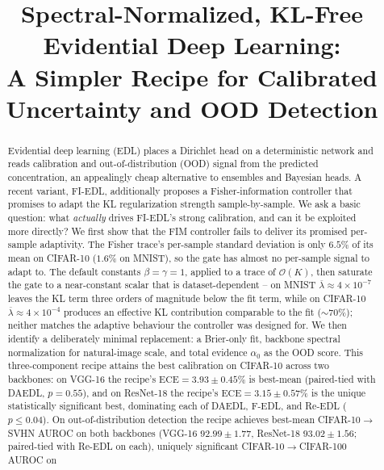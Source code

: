 \documentclass[review,5p,times]{elsarticle}
\newcommand{\todo}[1]{\textcolor{red}{\textbf{[TODO: #1]}}}
\begin{document}
\begin{frontmatter}

\title{Spectral-Normalized, KL-Free Evidential Deep Learning:\\
A Simpler Recipe for Calibrated Uncertainty and OOD Detection}


\begin{abstract}
Evidential deep learning (EDL) places a Dirichlet head on a deterministic
network and reads calibration and out-of-distribution (OOD) signal from the
predicted concentration, an appealingly cheap alternative to ensembles and
Bayesian heads. A recent variant, FI-EDL, additionally proposes a
Fisher-information controller that promises to adapt the KL regularization
strength sample-by-sample. We ask a basic question: what \emph{actually}
drives FI-EDL's strong calibration, and can it be exploited more directly?
We first show that the FIM controller fails to deliver its promised
per-sample adaptivity. The Fisher trace's per-sample standard deviation
is only $6.5\%$ of its mean on CIFAR-10 ($1.6\%$ on MNIST), so the gate
has almost no per-sample signal to adapt to. The default constants
$\beta\!=\!\gamma\!=\!1$, applied to a trace of $\mathcal{O}(K)$, then
saturate the gate to a near-constant scalar that is dataset-dependent --
on MNIST $\overline{\lambda}\!\approx\!4\!\times\!10^{-7}$ leaves the KL
term three orders of magnitude below the fit term, while on CIFAR-10
$\overline{\lambda}\!\approx\!4\!\times\!10^{-4}$ produces an effective
KL contribution comparable to the fit ($\sim\!70\%$); neither matches the
adaptive behaviour the controller was designed for. We then identify a deliberately minimal
replacement: a Brier-only fit, backbone spectral normalization for
natural-image scale, and total evidence $\alpha_0$ as the OOD score. This
three-component recipe attains the best calibration on CIFAR-10 across
two backbones: on VGG-16 the recipe's $\text{ECE}\!=\!3.93\!\pm\!0.45\%$
is best-mean (paired-tied with DAEDL, $p\!=\!0.55$), and on ResNet-18
the recipe's $\text{ECE}\!=\!3.15\!\pm\!0.57\%$ is the unique
statistically significant best, dominating each of DAEDL, F-EDL, and
Re-EDL ($p\!\le\!0.04$). On out-of-distribution detection the recipe
achieves best-mean CIFAR-10$\to$SVHN AUROC on both backbones (VGG-16
$92.99\!\pm\!1.77$, ResNet-18 $93.02\!\pm\!1.56$; paired-tied with
Re-EDL on each), uniquely significant CIFAR-10$\to$CIFAR-100 AUROC on

\end{abstract}
\end{frontmatter}
\end{document}
